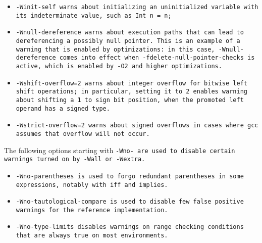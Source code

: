 \begin{itemize}
\item \tt{-Winit-self} warns about initializing an uninitialized
variable with its indeterminate value, such as \tt{Int n = n;}

\item \tt{-Wnull-dereference} warns about execution paths
that can lead to dereferencing a possibly null pointer.
This is an example of a warning that is enabled by optimizations: in this case,
\tt{-Wnull-dereference} comes into effect when \tt{-fdelete-null-pointer-checks}
is active, which is enabled by \tt{-O2} and higher optimizations.

\item \tt{-Wshift-overflow=2} warns about integer overflow for bitwise left shift
operations; in particular, setting it to \tt{2} enables warning about shifting
a \tt{1} to sign bit position, when the promoted left operand has a signed type.

\item \tt{-Wstrict-overflow=2} warns about signed overflows
in cases where \tt{gcc} assumes that overflow will not occur.

\end{itemize}

The following options starting with \tt{-Wno-} are used to
disable certain warnings turned on by \tt{-Wall} or \tt{-Wextra}.

\begin{itemize}

\item \tt{-Wno-parentheses} is used to forgo redundant parentheses
in some expressions, notably with \tt{iff} and \tt{implies}.

\item \tt{-Wno-tautological-compare} is used to disable few
false positive warnings for the reference implementation.

\item \tt{-Wno-type-limits} disables warnings on range
checking conditions that are always true on most environments.

\end{itemize}
